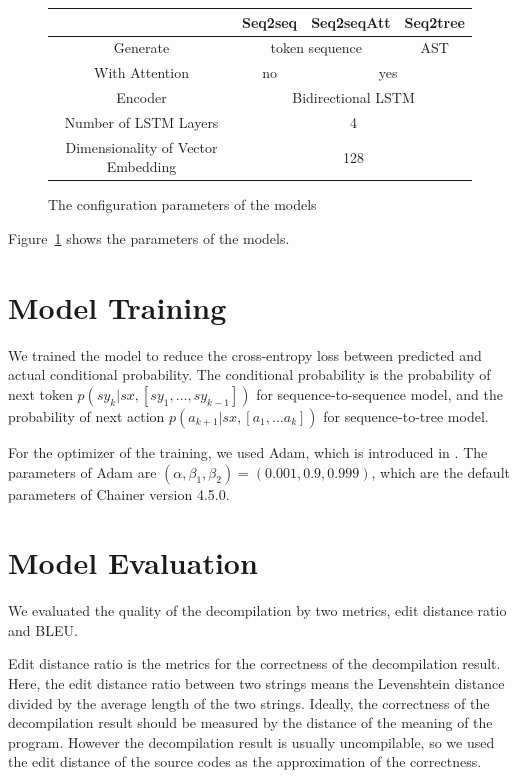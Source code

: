 \documentclass[senior,final,11pt]{iscs-thesis}
\begin{document}
\begin{figure}[h]
	\begin{tabular}{|c||c|c|c|}
		\hline
		  & Seq2seq & Seq2seqAtt & Seq2tree \\ \hline \hline
		 Generate & \multicolumn{2}{|c|}{token sequence} & AST \\ \hline
		 With Attention & no & \multicolumn{2}{|c|}{yes} \\ \hline
		 Encoder & \multicolumn{3}{|c|}{Bidirectional LSTM} \\ \hline
		Number of LSTM Layers & \multicolumn{3}{|c|}{4} \\ \hline
		Dimensionality of Vector Embedding & \multicolumn{3}{|c|}{128} \\ \hline
	\end{tabular}
	\caption{The configuration parameters of the models}
	\label{fig:parameterofmodels}
\end{figure}

Figure~\ref{fig:parameterofmodels} shows the parameters of the models. 


\section{Model Training}
We trained the model to reduce the cross-entropy loss between predicted and actual conditional probability.
The conditional probability is the probability of next token $ p(sy_k|sx,[sy_1,\dots,sy_{k-1}]) $ for sequence-to-sequence model, 
and the probability of next action $p(a_{k+1}|sx,[a_1, \dots a_{k}]) $ for sequence-to-tree model.

For the optimizer of the training, we used Adam, which is introduced in \cite{Adam}.
The parameters of Adam are $ (\alpha,\beta_1,\beta_2) = (0.001,0.9,0.999) $, which are the default parameters of Chainer version 4.5.0.

\section{Model Evaluation}
We evaluated the quality of the decompilation by two metrics, edit distance ratio and BLEU.

Edit distance ratio is the metrics for the correctness of the decompilation result.
Here, the edit distance ratio between two strings means the Levenshtein distance divided by the average length of the two strings.
Ideally, the correctness of the decompilation result should be measured by the distance of the meaning of the program.
However the decompilation result is usually uncompilable, so we used the edit distance of the source codes as the approximation of the correctness.
\end{document}
